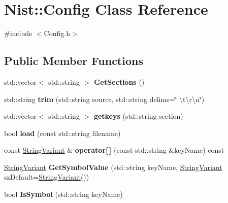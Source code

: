 \hypertarget{class_nist_1_1_config}{}\section{Nist\+:\+:Config Class Reference}
\label{class_nist_1_1_config}


{\ttfamily \#include $<$Config.\+h$>$}

\subsection*{Public Member Functions}
\begin{DoxyCompactItemize}
\item 
\hypertarget{class_nist_1_1_config_a7b7e16987717f5cf8013d98f400798f4}{}std\+::vector$<$ std\+::string $>$ {\bfseries Get\+Sections} ()\label{class_nist_1_1_config_a7b7e16987717f5cf8013d98f400798f4}

\item 
\hypertarget{class_nist_1_1_config_ad2c086f4d661b720a55a6c3c47cf6243}{}std\+::string {\bfseries trim} (std\+::string source, std\+::string delims=\char`\"{} \textbackslash{}t\textbackslash{}r\textbackslash{}n\char`\"{})\label{class_nist_1_1_config_ad2c086f4d661b720a55a6c3c47cf6243}

\item 
\hypertarget{class_nist_1_1_config_ac89a47a9988ebcbb657c74d6c9e3940d}{}std\+::vector$<$ std\+::string $>$ {\bfseries getkeys} (std\+::string section)\label{class_nist_1_1_config_ac89a47a9988ebcbb657c74d6c9e3940d}

\item 
\hypertarget{class_nist_1_1_config_ae845797e2ed12d96ba4bab21d781ffc7}{}bool {\bfseries load} (const std\+::string filename)\label{class_nist_1_1_config_ae845797e2ed12d96ba4bab21d781ffc7}

\item 
\hypertarget{class_nist_1_1_config_a572d2e28f2c2652f11ae8a301fed8021}{}const \hyperlink{class_nist_1_1_string_variant}{String\+Variant} \& {\bfseries operator\mbox{[}$\,$\mbox{]}} (const std\+::string \&key\+Name) const \label{class_nist_1_1_config_a572d2e28f2c2652f11ae8a301fed8021}

\item 
\hypertarget{class_nist_1_1_config_aab9962ecf966f8ef500b093517695fc1}{}\hyperlink{class_nist_1_1_string_variant}{String\+Variant} {\bfseries Get\+Symbol\+Value} (std\+::string key\+Name, \hyperlink{class_nist_1_1_string_variant}{String\+Variant} sz\+Default=\hyperlink{class_nist_1_1_string_variant}{String\+Variant}())\label{class_nist_1_1_config_aab9962ecf966f8ef500b093517695fc1}

\item 
\hypertarget{class_nist_1_1_config_abf58c97a029cb986a054aa806a3b3450}{}bool {\bfseries Is\+Symbol} (std\+::string key\+Name)\label{class_nist_1_1_config_abf58c97a029cb986a054aa806a3b3450}

\end{DoxyCompactItemize}


